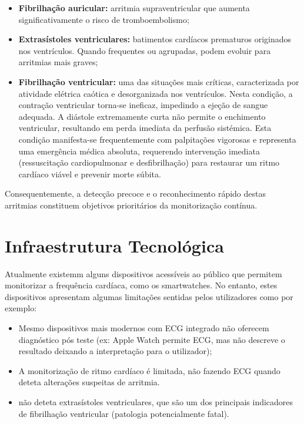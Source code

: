 \documentclass[11pt,a4paper]{article}
\begin{document}
\begin{itemize}
    \item \textbf{Fibrilhação auricular:} arritmia supraventricular que aumenta significativamente o risco de tromboembolismo;

    \item \textbf{Extrasístoles ventriculares:} batimentos cardíacos prematuros originados nos ventrículos. Quando frequentes ou agrupadas, podem evoluir para arritmias mais graves;

    \item \textbf{Fibrilhação ventricular:} uma das situações mais críticas, caracterizada por atividade elétrica caótica e desorganizada nos ventrículos. Nesta condição, 
    a contração ventricular torna-se ineficaz, impedindo a ejeção de sangue adequada. A diástole extremamente curta não permite o enchimento ventricular, resultando em perda 
    imediata da perfusão sistémica. Esta condição manifesta-se frequentemente com palpitações vigorosas e representa uma emergência médica absoluta, requerendo intervenção imediata 
    (ressuscitação cardiopulmonar e desfibrilhação) para restaurar um ritmo cardíaco viável e prevenir morte súbita.
\end{itemize}

Consequentemente, a detecção precoce e o reconhecimento rápido destas arritmias
constituem objetivos prioritários da monitorização contínua.

\section*{Infraestrutura Tecnológica}
Atualmente existemm alguns dispositivos acessíveis ao público que permitem monitorizar a frequência cardíaca, como os 
smartwatches. No entanto, estes dispositivos apresentam algumas limitações sentidas 
pelos utilizadores como por exemplo:
\begin{itemize}
      \item Mesmo dispositivos mais modernos com ECG integrado não 
      oferecem diagnóstico pós teste (ex: Apple Watch permite ECG, mas não descreve o resultado
      deixando a interpretação para o utilizador);
      \item A monitorização de ritmo cardíaco é limitada, não fazendo ECG quando deteta 
      alterações suspeitas de arritmia.
      \item não deteta extrasístoles ventriculares, que são um dos principais indicadores de 
      fibrilhação ventricular (patologia potencialmente fatal).
\end{itemize}
\end{document}
